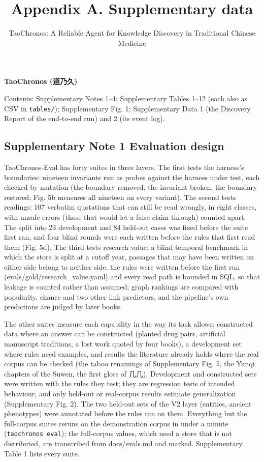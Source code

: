 \documentclass[
]{article}
\title{Appendix A. Supplementary data}
\subtitle{TaoChronos: A Reliable Agent for Knowledge Discovery in
Traditional Chinese Medicine}
\author{}
\date{}
\begin{document}
\maketitle

\textbf{TaoChronos (道乃久)}

Contents: Supplementary Notes 1--4; Supplementary Tables 1--12 (each
also as CSV in \texttt{tables/}); Supplementary Fig. 1; Supplementary
Data 1 (the Discovery Report of the end-to-end run) and 2 (its event
log).

\hypertarget{supplementary-note-1-evaluation-design}{%
\subsection{Supplementary Note 1 \textbar{} Evaluation
design}\label{supplementary-note-1-evaluation-design}}

TaoChronos-Eval has forty suites in three layers. The first tests the
harness's boundaries: nineteen invariants run as probes against the
harness under test, each checked by mutation (the boundary removed, the
invariant broken, the boundary restored; Fig. 5b measures all nineteen
on every variant). The second tests readings: 107 verbatim quotations
that can still be read wrongly, in eight classes, with unsafe errors
(those that would let a false claim through) counted apart. The split
into 23 development and 84 held-out cases was fixed before the suite
first ran, and four blind rounds were each written before the rules that
first read them (Fig. 5d). The third tests research value: a blind
temporal benchmark in which the store is split at a cutoff year,
passages that may have been written on either side belong to neither
side, the rules were written before the first run
(evals/gold/research\_value.yaml) and every read path is bounded in SQL,
so that leakage is counted rather than assumed; graph rankings are
compared with popularity, chance and two other link predictors, and the
pipeline's own predictions are judged by later books.

The other suites measure each capability in the way its task allows:
constructed data where an answer can be constructed (planted drug pairs,
artificial manuscript traditions, a lost work quoted by four books), a
development set where rules need examples, and results the literature
already holds where the real corpus can be checked (the taboo renamings
of Supplementary Fig. 5, the Yunqi chapters of the Suwen, the first
gloss of 几几). Development and constructed sets were written with the
rules they test; they are regression tests of intended behaviour, and
only held-out or real-corpus results estimate generalization
(Supplementary Fig. 2). The two held-out sets of the V2 layer (entities,
ancient phenotypes) were annotated before the rules ran on them.
Everything but the full-corpus suites reruns on the demonstration corpus
in under a minute (\texttt{taochronos\ eval}); the full-corpus values,
which need a store that is not distributed, are transcribed from
docs/evals.md and marked. Supplementary Table 1 lists every suite.
\end{document}
